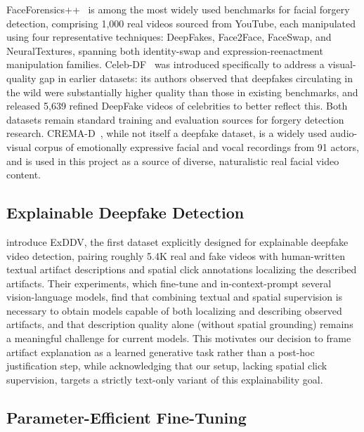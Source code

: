 \documentclass[acmsmall,review=false]{acmart}
\begin{document}
FaceForensics++~\citep{rossler2019faceforensics} is among the most widely used
benchmarks for facial forgery detection, comprising 1,000 real videos sourced
from YouTube, each manipulated using four representative techniques: DeepFakes,
Face2Face, FaceSwap, and NeuralTextures, spanning both identity-swap and
expression-reenactment manipulation families. Celeb-DF~\citep{li2020celebdf}
was introduced specifically to address a visual-quality gap in earlier
datasets: its authors observed that deepfakes circulating in the wild were
substantially higher quality than those in existing benchmarks, and released
5,639 refined DeepFake videos of celebrities to better reflect this. Both
datasets remain standard training and evaluation sources for forgery detection
research. CREMA-D~\citep{cao2014cremad}, while not itself a deepfake dataset,
is a widely used audio-visual corpus of emotionally expressive facial and vocal
recordings from 91 actors, and is used in this project as a source of diverse,
naturalistic real facial video content.

\subsection{Explainable Deepfake Detection}

\citet{hondru2025exddv} introduce ExDDV, the first dataset explicitly designed
for explainable deepfake video detection, pairing roughly 5.4K real and fake
videos with human-written textual artifact descriptions and spatial click
annotations localizing the described artifacts. Their experiments, which
fine-tune and in-context-prompt several vision-language models, find that
combining textual and spatial supervision is necessary to obtain models capable
of both localizing and describing observed artifacts, and that description
quality alone (without spatial grounding) remains a meaningful challenge for
current models. This motivates our decision to frame artifact explanation as a
learned generative task rather than a post-hoc justification step, while
acknowledging that our setup, lacking spatial click supervision, targets a
strictly text-only variant of this explainability goal.

\subsection{Parameter-Efficient Fine-Tuning}
\end{document}
